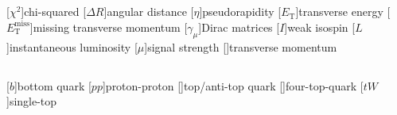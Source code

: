 \documentclass[thesis.tex]{subfiles}
\begin{document}
\begin{abbrev}

\subsection*{}
\begin{acronym}
	[$\chi^2$]{chi-squared}
	[$\Delta R$]{angular distance}
	[$\eta$]{pseudorapidity}
	[$E_\mathrm{T}$]{transverse energy}
	[$E_\mathrm{T}^\mathrm{miss}$]{missing transverse momentum}
	[$\gamma_\mu$]{Dirac matrices}
	[$I$]{weak isospin}
	[$L$]{instantaneous luminosity}
	[$\mu$]{signal strength}
	[\pT]{transverse momentum}
\end{acronym}

\subsection*{}
\begin{acronym}
[$b$]{bottom quark}
[$pp$]{proton-proton}
[\ttbar]{top/anti-top quark}
[\tttt]{four-top-quark}
[$tW$]{single-top}
\end{acronym}


\end{abbrev}
\end{document}

